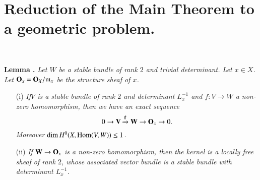 \section{Reduction of the Main Theorem to a geometric problem.}\label{art17-sec7}

~

\medskip
\noindent
{\bf Lemma .\label{art17-lem7.1}}
{\em Let $W$ be a stable bundle of rank $2$ and trivial determinant. Let $x\in X$. Let $\mathbf{O}_{x}=\mathbf{O}_{X}/\mathfrak{m}_{x}$ be the structure sheaf of $x$.}
\begin{itemize}
\item[\rm(i)] {\em If\pageoriginale $V$ is a stable bundle of rank $2$ and determinant $L^{-1}_{x}$ and $f:V\to W$ a non-zero homomorphism, then we have an exact sequence}
$$
0\to \mathbf{V}\xrightarrow{\mathbf{f}}\mathbf{W}\to \mathbf{O}_{x}\to 0.
$$
{\em Moreover $\dim H^{0}(X,\operatorname{\mathrm{Hom}}(V,W))\leq 1$.}

\item[\rm(ii)] {\em If $\mathbf{W}\to \mathbf{O}_{x}$ is a non-zero homomorphism, then the kernel is a locally free sheaf of rank $2$, whose associated vector bundle is a stable bundle with determinant $L^{-1}_{x}$.}
\end{itemize}

